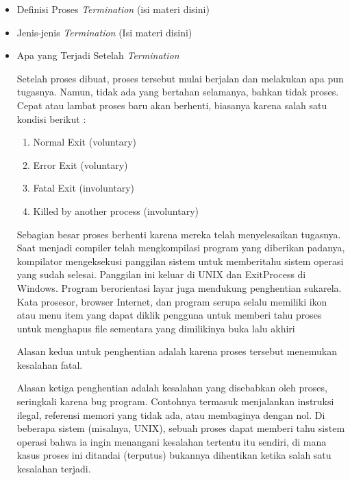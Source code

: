 \documentclass[12pt]{article}
\begin{document}
\begin{itemize}
    \item Definisi Proses \textit{Termination}
     (isi materi disini)

    \item Jenis-jenis \textit{Termination}
    (Isi materi disini)

    \item Apa yang Terjadi Setelah \textit{Termination}
    

    Setelah proses dibuat, proses tersebut mulai berjalan dan melakukan apa 
    pun tugasnya. Namun, tidak ada yang bertahan selamanya, bahkan tidak proses. 
    Cepat atau lambat proses baru akan berhenti, biasanya karena salah satu kondisi 
    berikut :

    \begin{enumerate}
        \item Normal Exit (voluntary)
        \item Error Exit (voluntary)
        \item Fatal Exit (involuntary)
        \item Killed by another process (involuntary)
    \end{enumerate}

    Sebagian besar proses berhenti karena mereka telah menyelesaikan 
    tugasnya. Saat menjadi compiler telah mengkompilasi program yang diberikan 
    padanya, kompilator mengeksekusi panggilan sistem untuk memberitahu sistem 
    operasi yang sudah selesai. Panggilan ini keluar di UNIX dan ExitProcess di 
    Windows. Program berorientasi layar juga mendukung penghentian sukarela. 
    Kata prosesor, browser Internet, dan program serupa selalu memiliki ikon atau 
    menu item yang dapat diklik pengguna untuk memberi tahu proses untuk 
    menghapus file sementara yang dimilikinya buka lalu akhiri

    Alasan kedua untuk penghentian adalah karena proses tersebut 
    menemukan kesalahan fatal.

    Alasan ketiga penghentian adalah kesalahan yang disebabkan oleh 
    proses, seringkali karena bug program. Contohnya termasuk menjalankan 
    instruksi ilegal, referensi memori yang tidak ada, atau membaginya dengan nol. 
    Di beberapa sistem (misalnya, UNIX), sebuah proses dapat memberi tahu sistem 
    operasi bahwa ia ingin menangani kesalahan tertentu itu sendiri, di mana kasus 
    proses ini ditandai (terputus) bukannya dihentikan ketika salah satu kesalahan 
    terjadi.


\end{itemize}
\end{document}
